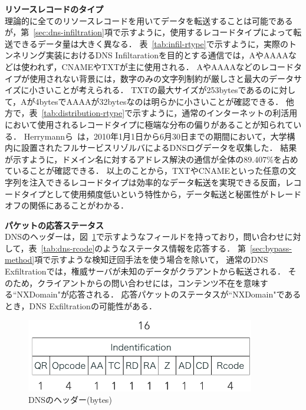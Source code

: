\hspace{-12pt}\textbf{リソースレコードのタイプ}\\
\hspace{12pt}理論的に全てのリソースレコードを用いてデータを転送することは可能であるが，第~\ref{sec:dns-infiltration}項で示すように，使用するレコードタイプによって転送できるデータ量は大きく異なる．
表~\ref{tab:infil-rtype}で示すように，実際のトンネリング実装におけるDNS Infiltarationを目的とする通信では，AやAAAAなどは使われず，CNAMEやTXTが主に使用される．
AやAAAAなどのレコードタイプが使用されない背景には，数字のみの文字列制約が厳しさと最大のデータサイズに小さいことが考えられる．
TXTの最大サイズが253bytesであるのに対して，Aが4bytesでAAAAが32bytesなのは明らかに小さいことが確認できる．
他方で，表~\ref{tab:distribution-rtype}で示すように，通常のインターネットの利活用において使用されるレコードタイプに極端な分布の偏りがあることが知られている．
Herrymannら~\cite{Herrymann}は，2010年1月1日から6月30日までの期間において，大学構内に設置されたフルサービスリゾルバによるDNSログデータを収集した．
結果が示すように，ドメイン名に対するアドレス解決の通信が全体の89.407\%を占めていることが確認できる．
以上のことから，TXTやCNAMEといった任意の文字列を注入できるレコードタイプは効率的なデータ転送を実現できる反面，レコードタイプとして使用頻度低いという特性から，データ転送と秘匿性がトレードオフの関係にあることがわかる．



%
%
\newpage
\hspace{-12pt}\textbf{パケットの応答ステータス}\\
\hspace{12pt}DNSのヘッダーは，図~\ref{fig:dns-header}で示すようなフィールドを持っており，問い合わせに対して，表~\ref{tab:dns-rcode}のようなステータス情報を応答する．
第~\ref{sec:bypass-method}項で示すような検知迂回手法を使う場合を除いて，
通常のDNS Exfiltrationでは，権威サーバが未知のデータがクラアントから転送される．
そのため，クライアントからの問い合わせには，コンテンツ不在を意味する``NXDomain"が応答される．
応答パケットのステータスが``NXDomain"であるとき，DNS Exfiltrationの可能性がある．
\begin{figure}[h]
 \centering
 \includegraphics[width=10.0cm]{figure/dns-header.png}
 \caption{DNSのヘッダー(bytes)}
 \label{fig:dns-header}
\end{figure}

